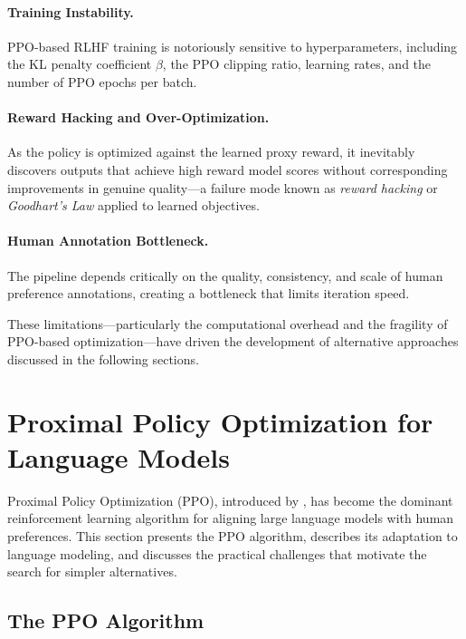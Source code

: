 \documentclass[12pt,a4paper]{report}
\theoremstyle{definition}
\begin{document}
\paragraph{Training Instability.}
PPO-based RLHF training is notoriously sensitive to hyperparameters, including the KL penalty coefficient $\beta$, the PPO clipping ratio, learning rates, and the number of PPO epochs per batch.

\paragraph{Reward Hacking and Over-Optimization.}
As the policy is optimized against the learned proxy reward, it inevitably discovers outputs that achieve high reward model scores without corresponding improvements in genuine quality---a failure mode known as \emph{reward hacking} or \emph{Goodhart's Law} applied to learned objectives.

\paragraph{Human Annotation Bottleneck.}
The pipeline depends critically on the quality, consistency, and scale of human preference annotations, creating a bottleneck that limits iteration speed.

\vspace{0.5em}
\noindent These limitations---particularly the computational overhead and the fragility of PPO-based optimization---have driven the development of alternative approaches discussed in the following sections.


\section{Proximal Policy Optimization for Language Models}
\label{sec:ppo}

Proximal Policy Optimization (PPO), introduced by \cite{schulman2017ppo}, has become the dominant reinforcement learning algorithm for aligning large language models with human preferences. This section presents the PPO algorithm, describes its adaptation to language modeling, and discusses the practical challenges that motivate the search for simpler alternatives.

\subsection{The PPO Algorithm}
\end{document}
